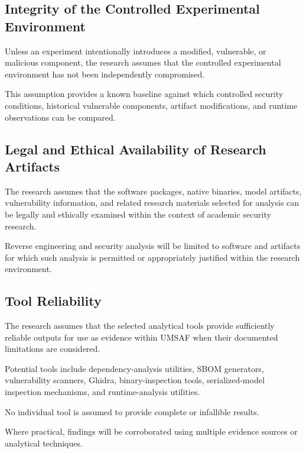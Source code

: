 \documentclass[
  12pt,
  letterpaper,
  oneside]{report}
\begin{document}
\subsection{Integrity of the Controlled Experimental Environment}\label{1329-integrity-of-the-controlled-experimental-environment}

Unless an experiment intentionally introduces a modified, vulnerable, or
malicious component, the research assumes that the controlled
experimental environment has not been independently compromised.

This assumption provides a known baseline against which controlled
security conditions, historical vulnerable components, artifact
modifications, and runtime observations can be compared.

\subsection{Legal and Ethical Availability of Research Artifacts}\label{13210-legal-and-ethical-availability-of-research-artifacts}

The research assumes that the software packages, native binaries, model
artifacts, vulnerability information, and related research materials
selected for analysis can be legally and ethically examined within the
context of academic security research.

Reverse engineering and security analysis will be limited to software
and artifacts for which such analysis is permitted or appropriately
justified within the research environment.

\subsection{Tool Reliability}\label{13211-tool-reliability}

The research assumes that the selected analytical tools provide
sufficiently reliable outputs for use as evidence within UMSAF when
their documented limitations are considered.

Potential tools include dependency-analysis utilities, SBOM generators,
vulnerability scanners, Ghidra, binary-inspection tools,
serialized-model inspection mechanisms, and runtime-analysis utilities.

No individual tool is assumed to provide complete or infallible results.

Where practical, findings will be corroborated using multiple evidence
sources or analytical techniques.
\end{document}
